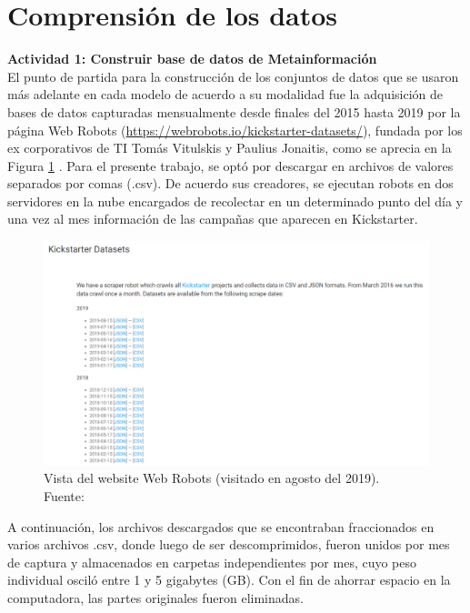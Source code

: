 \section{Comprensión de los datos}
\textbf{Actividad 1: Construir base de datos de Metainformación}
\\
El punto de partida para la construcción de los conjuntos de datos que se usaron más adelante en cada modelo de acuerdo a su modalidad fue la adquisición de bases de datos capturadas mensualmente desde finales del 2015 hasta 2019 por la página Web Robots (\url{https://webrobots.io/kickstarter-datasets/}), fundada por los ex corporativos de TI Tomás Vitulskis y Paulius Jonaitis, como se aprecia en la Figura \ref{4:fig1} \cite{ot_webrobots2019kickstarter}. Para el presente trabajo, se optó por descargar en archivos de valores separados por comas (.csv). De acuerdo sus creadores, se ejecutan robots en dos servidores en la nube encargados de recolectar en un determinado punto del día y una vez al mes información de las campañas que aparecen en Kickstarter.

\begin{figure}[!ht]
	\begin{center}
		\includegraphics[width=1\textwidth]{4/figures/web_robots_2019.png}
		\caption[Vista del website Web Robots (visitado en agosto del 2019)]{Vista del website Web Robots (visitado en agosto del 2019).\\
			Fuente: \cite{ot_webrobots2019kickstarter}}
		\label{4:fig1}
	\end{center}
\end{figure}

A continuación, los archivos descargados que se encontraban fraccionados en varios archivos .csv, donde luego de ser descomprimidos, fueron unidos por mes de captura y almacenados en carpetas independientes por mes, cuyo peso individual osciló entre 1 y 5 gigabytes (GB). Con el fin de ahorrar espacio en la computadora, las partes originales fueron eliminadas.

